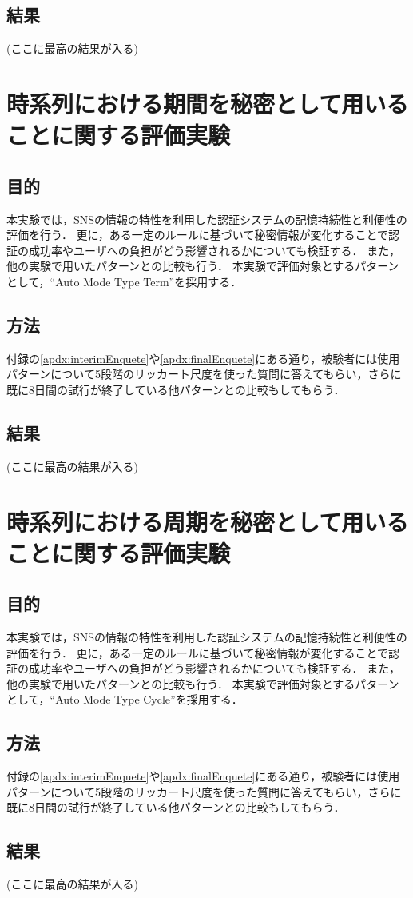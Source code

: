 \subsection{結果}
(ここに最高の結果が入る)

\section{時系列における期間を秘密として用いることに関する評価実験}\label{sec:vsTerm}
\subsection{目的}
本実験では，SNSの情報の特性を利用した認証システムの記憶持続性と利便性の評価を行う．
更に，ある一定のルールに基づいて秘密情報が変化することで認証の成功率やユーザへの負担がどう影響されるかについても検証する．
また，他の実験で用いたパターンとの比較も行う．
本実験で評価対象とするパターンとして，``Auto Mode Type Term''を採用する．

\subsection{方法}
付録の\ref{apdx:interimEnquete}や\ref{apdx:finalEnquete}にある通り，被験者には使用パターンについて5段階のリッカート尺度を使った質問に答えてもらい，さらに既に8日間の試行が終了している他パターンとの比較もしてもらう．

\subsection{結果}
(ここに最高の結果が入る)

\section{時系列における周期を秘密として用いることに関する評価実験}\label{sec:vsCycle}
\subsection{目的}
本実験では，SNSの情報の特性を利用した認証システムの記憶持続性と利便性の評価を行う．
更に，ある一定のルールに基づいて秘密情報が変化することで認証の成功率やユーザへの負担がどう影響されるかについても検証する．
また，他の実験で用いたパターンとの比較も行う．
本実験で評価対象とするパターンとして，``Auto Mode Type Cycle''を採用する．

\subsection{方法}
付録の\ref{apdx:interimEnquete}や\ref{apdx:finalEnquete}にある通り，被験者には使用パターンについて5段階のリッカート尺度を使った質問に答えてもらい，さらに既に8日間の試行が終了している他パターンとの比較もしてもらう．

\subsection{結果}
(ここに最高の結果が入る)

\newpage

